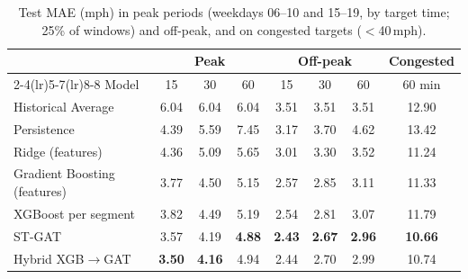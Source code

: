\begin{table}[t]
\centering
\caption{Test MAE (mph) in peak periods (weekdays 06--10 and 15--19, by target time; 25\% of windows) and off-peak, and on congested targets ($<$40\,mph).}
\label{tab:p2regime}
\setlength{\tabcolsep}{3.5pt}
\begin{tabular}{lccccccc}
\toprule
 & \multicolumn{3}{c}{Peak} & \multicolumn{3}{c}{Off-peak} & Congested \\ \cmidrule(lr){2-4}\cmidrule(lr){5-7}\cmidrule(lr){8-8}
Model & 15 & 30 & 60 & 15 & 30 & 60 & 60 min \\
\midrule
Historical Average & 6.04 & 6.04 & 6.04 & 3.51 & 3.51 & 3.51 & 12.90 \\
Persistence & 4.39 & 5.59 & 7.45 & 3.17 & 3.70 & 4.62 & 13.42 \\
Ridge (features) & 4.36 & 5.09 & 5.65 & 3.01 & 3.30 & 3.52 & 11.24 \\
Gradient Boosting (features) & 3.77 & 4.50 & 5.15 & 2.57 & 2.85 & 3.11 & 11.33 \\
XGBoost per segment & 3.82 & 4.49 & 5.19 & 2.54 & 2.81 & 3.07 & 11.79 \\
ST-GAT & 3.57 & 4.19 & \textbf{4.88} & \textbf{2.43} & \textbf{2.67} & \textbf{2.96} & \textbf{10.66} \\
Hybrid XGB$\to$GAT & \textbf{3.50} & \textbf{4.16} & 4.94 & 2.44 & 2.70 & 2.99 & 10.74 \\
\bottomrule
\end{tabular}
\end{table}